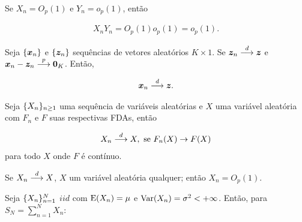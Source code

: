 \documentclass[11pt, oneside, a4paper, article]{article}
\numberwithin{equation}{section}
\begin{document}
\begin{description}
\begin{description}
\begin{def1}
Se
$X_{n} = O_{p}(1)$ e $Y_{n} = o_{p}(1)$, então

\vspace{-1 em}
\begin{align*}
	X_{n} Y_{n} = O_{p}(1) o_{p}(1) = o_{p}(1).
\end{align*}
\end{def1}

\begin{def1}
Seja
$\{\boldsymbol{x}_{n}\}$ e $\{\boldsymbol{z}_{n}\}$
sequências de vetores aleatórios $K \times 1$.
Se $\boldsymbol{z}_{n}  \overset{d}{\longrightarrow}  \boldsymbol{z}$ e 
$\boldsymbol{x}_{n} - \boldsymbol{z}_{n}  \overset{p}{\longrightarrow}  \boldsymbol{0}_{K}$.
Então, 

\vspace{-1 em}
\begin{align*}
\boldsymbol{x}_{n}  \overset{d}{\longrightarrow}  \boldsymbol{z}.
\end{align*}

\end{def1}

\begin{def1}
Seja
$\{X_{n}\}_{n \geq 1}$  uma sequência de variáveis aleatórias e $X$ uma variável aleatória com $F_{n}$ e $F$ suas respectivas FDAs, então

\begin{align*}
	X_{n}  \overset{d}{\longrightarrow}  X, \text{ se } F_{n}(X) \to F(X)
\end{align*}
\noindent
para todo $X$ onde $F$ é contínuo.
\end{def1}

\begin{def1}
Se $X_{n}  \overset{d}{\longrightarrow}  X$, $X$ um variável aleatória qualquer; então $X_{n} = O_{p}(1)$.
\end{def1}

\begin{def1}
Seja $\{X_{n}\}_{n = 1}^{N}$ $iid$ com $\text{E}(X_{n}) = \mu$ e $\text{Var}(X_{n}) = \sigma^{2} < + \infty$.
Então, para $S_{N} = \sum_{n=1}^{N} X_{n}$:


\end{def1}
\end{description}
\end{description}
\end{document}

